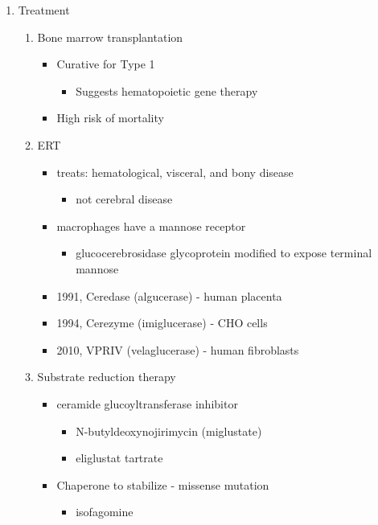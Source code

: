 \documentclass{scrartcl}
\begin{document}
\begin{enumerate}
\item Treatment
\label{sec:org65ec9b9}
\begin{enumerate}
\item Bone marrow transplantation
\label{sec:org280b928}
\begin{itemize}
\item Curative for Type 1
\begin{itemize}
\item Suggests hematopoietic gene therapy
\end{itemize}
\item High risk of mortality
\end{itemize}
\item ERT
\label{sec:org18a0359}
\begin{itemize}
\item treats: hematological, visceral, and bony disease
\begin{itemize}
\item not cerebral disease
\end{itemize}
\item macrophages have a mannose receptor
\begin{itemize}
\item glucocerebrosidase glycoprotein modified to expose terminal mannose
\end{itemize}
\item 1991, Ceredase (algucerase) - human placenta
\item 1994, Cerezyme (imiglucerase) - CHO cells
\item 2010, VPRIV (velaglucerase) - human fibroblasts
\end{itemize}

\item Substrate reduction therapy
\label{sec:org93926d7}
\begin{itemize}
\item ceramide glucoyltransferase inhibitor
\begin{itemize}
\item N-butyldeoxynojirimycin (miglustate)
\item eliglustat tartrate
\end{itemize}
\item Chaperone to stabilize - missense mutation
\begin{itemize}
\item isofagomine
\end{itemize}
\end{itemize}
\end{enumerate}
\end{enumerate}
\end{document}
